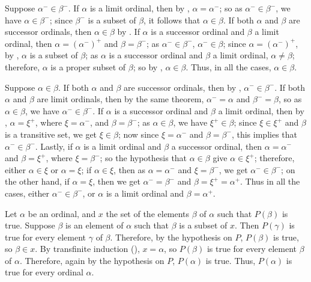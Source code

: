 \documentclass{article}
\begin{document}
\begin{solution}[\ref{exe:7tvca54w}]
  \label{sol:45jmdyf7}
  Suppose \(\alpha^- \in \beta^-\).  If \(\alpha\) is a limit ordinal,
  then by , \(\alpha = \alpha^-\); so as
  \(\alpha^- \in \beta^-\), we have \(\alpha \in \beta^-\); since
  \(\beta^-\) is a subset of \(\beta\), it follows that
  \(\alpha \in \beta\).  If both \(\alpha\) and \(\beta\) are
  successor ordinals, then \(\alpha \in \beta\) by
  .  If \(\alpha\) is a successor ordinal and
  \(\beta\) a limit ordinal, then \(\alpha = (\alpha^-)^+\) and
  \(\beta = \beta^-\); as \(\alpha^- \in \beta^-\),
  \(\alpha^- \in \beta\); since \(\alpha = (\alpha^-)^+\), by
  , \(\alpha\) is a subset of \(\beta\); as
  \(\alpha\) is a successor ordinal and \(\beta\) a limit ordinal,
  \(\alpha \neq \beta\); therefore, \(\alpha\) is a proper subset of
  \(\beta\); so by , \(\alpha \in \beta\).  Thus,
  in all the cases, \(\alpha \in \beta\).

  Suppose \(\alpha \in \beta\).  If both \(\alpha\) and \(\beta\) are
  successor ordinals, then by ,
  \(\alpha^- \in \beta^-\).  If both \(\alpha\) and \(\beta\) are
  limit ordinals, then by the same theorem, \(\alpha^- = \alpha\) and
  \(\beta^- = \beta\), so as \(\alpha \in \beta\), we have
  \(\alpha^- \in \beta^-\).  If \(\alpha\) is a successor ordinal and
  \(\beta\) a limit ordinal, then by ,
  \(\alpha = \xi^+\), where \(\xi = \alpha^-\), and
  \(\beta = \beta^-\); as \(\alpha \in \beta\), we have
  \(\xi^+ \in \beta\); since \(\xi \in \xi^+\) and \(\beta\) is a
  transitive set, we get \(\xi \in \beta\); now since
  \(\xi = \alpha^-\) and \(\beta = \beta^-\), this implies that
  \(\alpha^- \in \beta^-\).  Lastly, if \(\alpha\) is a limit ordinal
  and \(\beta\) a successor ordinal, then \(\alpha = \alpha^-\) and
  \(\beta = \xi^+\), where \(\xi = \beta^-\); so the hypothesis that
  \(\alpha \in \beta\) give \(\alpha \in \xi^+\); therefore, either
  \(\alpha \in \xi\) or \(\alpha = \xi\); if \(\alpha \in \xi\), then
  as \(\alpha = \alpha^-\) and \(\xi = \beta^-\), we get
  \(\alpha^- \in \beta^-\); on the other hand, if \(\alpha = \xi\),
  then we get \(\alpha^- = \beta^-\) and \(\beta = \xi^+ = \alpha^+\).
  Thus in all the cases, either \(\alpha^- \in \beta^-\), or
  \(\alpha\) is a limit ordinal and \(\beta = \alpha^+\).
\end{solution}

\begin{solution}[\ref{exe:jxzsy88l}]
  \label{sol:y7n1wugx}
  Let \(\alpha\) be an ordinal, and \(x\) the set of the elements
  \(\beta\) of \(\alpha\) such that \(P(\beta)\) is true.  Suppose
  \(\beta\) is an element of \(\alpha\) such that \(\beta\) is a
  subset of \(x\).  Then \(P(\gamma)\) is true for every element
  \(\gamma\) of \(\beta\).  Therefore, by the hypothesis on \(P\),
  \(P(\beta)\) is true, so \(\beta \in x\).  By transfinite induction
  (), \(x = \alpha\), so \(P(\beta)\) is true for
  every element \(\beta\) of \(\alpha\).  Therefore, again by the
  hypothesis on \(P\), \(P(\alpha)\) is true.  Thus, \(P(\alpha)\) is
  true for every ordinal \(\alpha\).
\end{solution}

\bibsection
\end{document}
